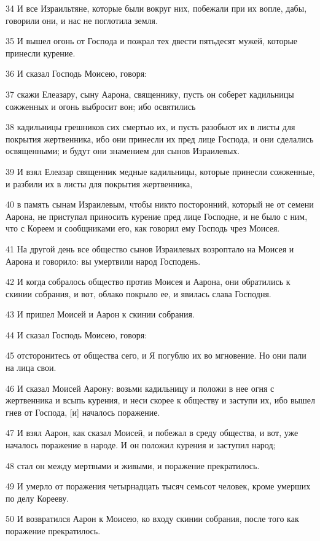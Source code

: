 \par 34 И все Израильтяне, которые были вокруг них, побежали при их вопле, дабы, говорили они, и нас не поглотила земля.
\par 35 И вышел огонь от Господа и пожрал тех двести пятьдесят мужей, которые принесли курение.
\par 36 И сказал Господь Моисею, говоря:
\par 37 скажи Елеазару, сыну Аарона, священнику, пусть он соберет кадильницы сожженных и огонь выбросит вон; ибо освятились
\par 38 кадильницы грешников сих смертью их, и пусть разобьют их в листы для покрытия жертвенника, ибо они принесли их пред лице Господа, и они сделались освященными; и будут они знамением для сынов Израилевых.
\par 39 И взял Елеазар священник медные кадильницы, которые принесли сожженные, и разбили их в листы для покрытия жертвенника,
\par 40 в память сынам Израилевым, чтобы никто посторонний, который не от семени Аарона, не приступал приносить курение пред лице Господне, и не было с ним, что с Кореем и сообщниками его, как говорил ему Господь чрез Моисея.
\par 41 На другой день все общество сынов Израилевых возроптало на Моисея и Аарона и говорило: вы умертвили народ Господень.
\par 42 И когда собралось общество против Моисея и Аарона, они обратились к скинии собрания, и вот, облако покрыло ее, и явилась слава Господня.
\par 43 И пришел Моисей и Аарон к скинии собрания.
\par 44 И сказал Господь Моисею, говоря:
\par 45 отсторонитесь от общества сего, и Я погублю их во мгновение. Но они пали на лица свои.
\par 46 И сказал Моисей Аарону: возьми кадильницу и положи в нее огня с жертвенника и всыпь курения, и неси скорее к обществу и заступи их, ибо вышел гнев от Господа, [и] началось поражение.
\par 47 И взял Аарон, как сказал Моисей, и побежал в среду общества, и вот, уже началось поражение в народе. И он положил курения и заступил народ;
\par 48 стал он между мертвыми и живыми, и поражение прекратилось.
\par 49 И умерло от поражения четырнадцать тысяч семьсот человек, кроме умерших по делу Корееву.
\par 50 И возвратился Аарон к Моисею, ко входу скинии собрания, после того как поражение прекратилось.

